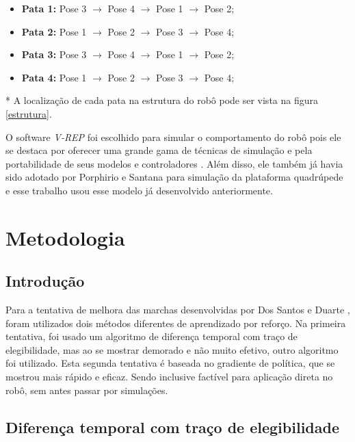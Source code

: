 \documentclass[12pt]{report}
\begin{document}
\begin{itemize}
    \item \textbf{Pata 1:} Pose 3 $\rightarrow$ Pose 4 $\rightarrow$ Pose 1 $\rightarrow$ Pose 2;
    \item \textbf{Pata 2:} Pose 1 $\rightarrow$ Pose 2 $\rightarrow$ Pose 3 $\rightarrow$ Pose 4;
    \item \textbf{Pata 3:} Pose 3 $\rightarrow$ Pose 4 $\rightarrow$ Pose 1 $\rightarrow$ Pose 2;
    \item \textbf{Pata 4:} Pose 1 $\rightarrow$ Pose 2 $\rightarrow$ Pose 3 $\rightarrow$ Pose 4;
\end{itemize}

* A localização de cada pata na estrutura do robô pode ser vista na figura \ref{estrutura}.
\vspace{0.3cm}

O software \textit{V-REP} foi escolhido para simular o comportamento do robô pois ele se destaca por oferecer uma grande gama de técnicas de simulação e pela portabilidade de seus modelos e controladores \cite{10}. Além disso, ele também já havia sido adotado por Porphirio e Santana \cite{10} para simulação da plataforma quadrúpede e esse trabalho usou esse modelo já desenvolvido anteriormente.


\vspace*{-0.6cm}
\chapter*{Metodologia}

\vspace*{-0.75cm}
\section*{Introdução}

Para a tentativa de melhora das marchas desenvolvidas por Dos Santos e Duarte \cite{2}, foram utilizados dois métodos diferentes de aprendizado por reforço. Na primeira tentativa, foi usado um algoritmo de diferença temporal com traço de elegibilidade, mas ao se mostrar demorado e não muito efetivo, outro algoritmo foi utilizado. Esta segunda tentativa é baseada no gradiente de política, que se mostrou mais rápido e eficaz. Sendo inclusive factível para aplicação direta no robô, sem antes passar por simulações.

\section*{Diferença temporal com traço de elegibilidade}
\end{document}
